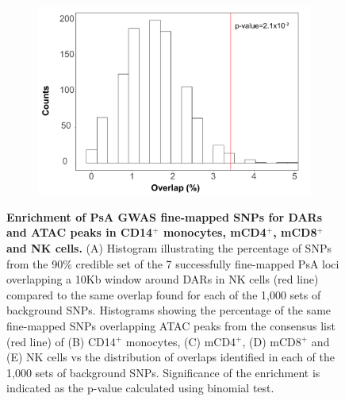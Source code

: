 \begin{figure}[htbp]
\begin{subfigure}[b]{0.40\textwidth}
\includegraphics[width=\textwidth]{./Results3/pdfs/PsA_FM_enrichment_for_NK_consensus_ATAC_peaks_inside}
\caption{}
\end{subfigure}
\caption[Enrichment of PsA GWAS fine-mapped SNPs for DARs and ATAC peaks in CD14$^+$ monocytes, mCD4$^+$, mCD8$^+$ and NK cells.]{\textbf{Enrichment of PsA GWAS fine-mapped SNPs for DARs and ATAC peaks in CD14$^+$ monocytes, mCD4$^+$, mCD8$^+$ and NK cells.} (A) Histogram illustrating the percentage of SNPs from the 90\% credible set of the 7 successfully fine-mapped PsA loci overlapping a 10Kb window around DARs in NK cells (red line) compared to the same overlap found for each of the 1,000 sets of background SNPs. Histograms showing the percentage of the same fine-mapped SNPs overlapping ATAC peaks from the consensus list (red line) of (B) CD14$^+$ monocytes, (C) mCD4$^+$, (D) mCD8$^+$ and (E) NK cells vs the distribution of overlaps identified in each of the 1,000 sets of background SNPs. Significance of the enrichment is indicated as the p-value calculated using binomial test.}
\label{figure:PsA_FM_enrichment_analysis_ATAC}
\end{figure}


